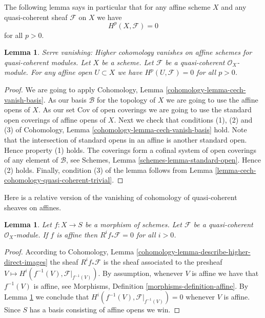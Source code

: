 \documentclass{stacks-project}
\newenvironment{slogan}{\comment}{\endcomment}
\theoremstyle{plain}
\newtheorem{lemma}[subsection]{Lemma}
\theoremstyle{definition}
\theoremstyle{remark}
\numberwithin{equation}{subsection}
\begin{document}
\noindent
The following lemma says in particular that for any affine scheme
$X$ and any quasi-coherent sheaf $\mathcal{F}$ on $X$ we have
$$
H^p(X, \mathcal{F}) = 0
$$
for all $p > 0$.

\begin{lemma}
\label{lemma-quasi-coherent-affine-cohomology-zero}
\begin{slogan}
Serre vanishing: Higher cohomology vanishes on affine schemes
for quasi-coherent modules.
\end{slogan}
Let $X$ be a scheme.
Let $\mathcal{F}$ be a quasi-coherent $\mathcal{O}_X$-module.
For any affine open $U \subset X$ we have
$H^p(U, \mathcal{F}) = 0$ for all $p > 0$.
\end{lemma}

\begin{proof}
We are going to apply
Cohomology, Lemma \ref{cohomology-lemma-cech-vanish-basis}.
As our basis $\mathcal{B}$ for the topology of $X$ we are going to use
the affine opens of $X$.
As our set $\text{Cov}$ of open coverings we are going to use the standard
open coverings of affine opens of $X$.
Next we check that conditions (1), (2) and (3) of
Cohomology, Lemma \ref{cohomology-lemma-cech-vanish-basis}
hold. Note that the intersection of standard opens in an affine is
another standard open. Hence property (1) holds.
The coverings form a cofinal system of open coverings of any element
of $\mathcal{B}$, see
Schemes, Lemma \ref{schemes-lemma-standard-open}.
Hence (2) holds.
Finally, condition (3) of the lemma follows from
Lemma \ref{lemma-cech-cohomology-quasi-coherent-trivial}.
\end{proof}

\noindent
Here is a relative version of the vanishing of cohomology of quasi-coherent
sheaves on affines.

\begin{lemma}
\label{lemma-relative-affine-vanishing}
Let $f : X \to S$ be a morphism of schemes.
Let $\mathcal{F}$ be a quasi-coherent $\mathcal{O}_X$-module.
If $f$ is affine then $R^if_*\mathcal{F} = 0$ for all $i > 0$.
\end{lemma}

\begin{proof}
According to
Cohomology, Lemma \ref{cohomology-lemma-describe-higher-direct-images}
the sheaf
$R^if_*\mathcal{F}$ is the sheaf associated to the presheaf
$V \mapsto H^i(f^{-1}(V), \mathcal{F}|_{f^{-1}(V)})$.
By assumption, whenever $V$ is affine we have that $f^{-1}(V)$ is
affine, see Morphisms, Definition \ref{morphisms-definition-affine}.
By Lemma \ref{lemma-quasi-coherent-affine-cohomology-zero} we conclude that
$H^i(f^{-1}(V), \mathcal{F}|_{f^{-1}(V)}) = 0$
whenever $V$ is affine. Since $S$ has a basis consisting of affine
opens we win.
\end{proof}
\end{document}
